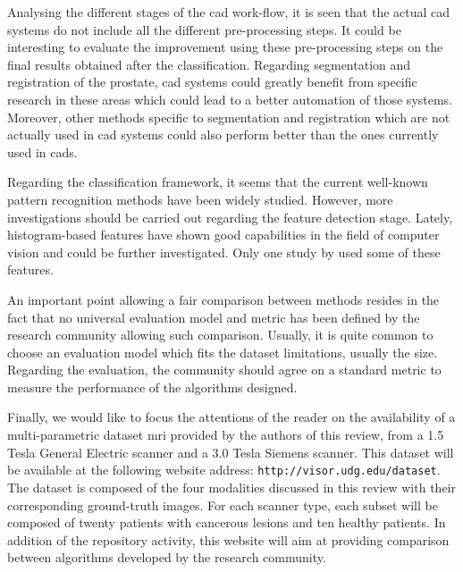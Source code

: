 Analysing the different stages of the \ac{cad} work-flow, it is seen that the actual \ac{cad} systems do not include all the different pre-processing steps. It could be interesting to evaluate the improvement using these pre-processing steps on the final results obtained after the classification. Regarding segmentation and registration of the prostate, \ac{cad} systems could greatly benefit from specific research in these areas which could lead to a better automation of those systems. Moreover, other methods specific to segmentation and registration which are not actually used in \ac{cad} systems could also perform better than the ones currently used in \acp{cad}.

Regarding the classification framework, it seems that the current well-known pattern recognition methods have been widely studied. However, more investigations should be carried out regarding the feature detection stage. Lately, histogram-based features have shown good capabilities in the field of computer vision and could be further investigated. Only one study by \cite{Liu2013} used some of these features.

An important point allowing a fair comparison between methods resides in the fact that no universal evaluation model and metric has been defined by the research community allowing such comparison. Usually, it is quite common to choose an evaluation model which fits the dataset limitations, usually the size. Regarding the evaluation, the community should agree on a standard metric to measure the performance of the algorithms designed.

Finally, we would like to focus the attentions of the reader on the availability of a multi-parametric dataset \ac{mri} provided by the authors of this review, from a 1.5 Tesla General Electric scanner and a 3.0 Tesla Siemens scanner. This dataset will be available at the following website address: \texttt{http://visor.udg.edu/dataset}. The dataset is composed of the four modalities discussed in this review with their corresponding ground-truth images. For each scanner type, each subset will be composed of twenty patients with cancerous lesions and ten healthy patients. In addition of the repository activity, this website will aim at providing comparison between algorithms developed by the research community.